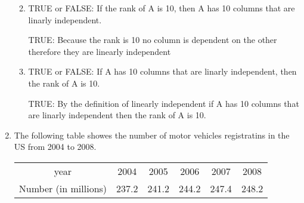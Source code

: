 \documentclass{article}
\begin{document}
\begin{enumerate}
\begin{enumerate}
        \vspace{0.5cm}
      \item TRUE or FALSE: If the rank of A is 10, then A has 10 columns that are linarly independent.
        \vspace{0.5cm}
        \par
        TRUE: Because the rank is 10 no column is dependent on the other therefore they are linearly independent
        \vspace{0.5cm}
      \item TRUE or FALSE: If A has 10 columns that are linarly independent, then the rank of A is 10.
        \vspace{0.5cm}
        \par
        TRUE: By the definition of linearly independent if A has 10 columns that are linarly independent then the rank of A is 10.
        \vspace{0.5cm}
    \end{enumerate}

  \item The following table showes the number of motor vehicles registratins in the US from 2004 to 2008.\

    \begin{center}
      \begin{tabular}{ c|ccccc } 
        \hline
        year & 2004 & 2005  & 2006 & 2007 & 2008\\ 
        Number (in millions) & 237.2 & 241.2 & 244.2 & 247.4 & 248.2 \\ 
        \hline
      \end{tabular}
    \end{center}


\end{enumerate}
\end{document}
